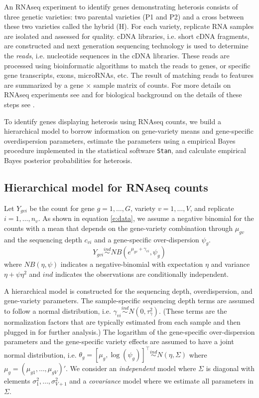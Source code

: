 \documentclass[useAMS,usenatbib,referee]{biom}
\begin{document}
An RNAseq experiment to identify genes demonstrating heterosis consists of three genetic varieties: two parental varieties (P1 and P2) and a cross between these two varieties called the hybrid (H). For each variety, replicate RNA samples are isolated and assessed for quality. cDNA libraries, i.e. short cDNA fragments, are constructed and next generation sequencing technology is used to determine the \emph{reads}, i.e. nucleotide sequences in the cDNA libraries. These reads are processed using bioinformatic algorithms to match the reads to genes, or specific gene transcripts, exons, microRNAs, etc. The result of matching reads to features are summarized by a gene $\times$ sample matrix of counts. For more details on RNAseq experiments see \cite{nettleton2014design} and for biological background on the details of these steps see \cite{paschold2012complementation}.

To identify genes displaying heterosis using RNAseq counts, we build a hierarchical model to borrow information on gene-variety means and gene-specific overdispersion parameters, estimate the parameters using a empirical Bayes procedure implemented in the statistical software {\tt Stan}, and calculate empirical Bayes posterior probabilities for heterosis. 


\subsection{Hierarchical model for RNAseq counts}
\label{s:model}

Let $Y_{gvi}$ be the count for gene $g=1,\ldots,G$, variety $v=1,\ldots,V$, and replicate $i=1,\ldots,n_v$. As shown in equation \eqref{e:data}, we assume a negative binomial for the counts with a mean that depends on the gene-variety combination through $\mu_{gv}$ and the sequencing depth $c_{vi}$ and a gene-specific over-dispersion $\psi_g$. 
\begin{equation} 
Y_{gvi} \stackrel{ind}{\sim} NB(e^{\mu_{gv}+\gamma_{vi}},\psi_g) 
\label{e:data}
\end{equation}
where $NB(\eta,\psi)$ indicates a negative-binomial with expectation $\eta$ and variance $\eta+\psi\eta^2$ and $ind$ indicates the observations are conditionally independent.

A hierarchical model is constructed for the sequencing depth, overdispersion, and gene-variety parameters. The sample-specific sequencing depth terms are assumed to follow a normal distribution, i.e. $\gamma_{vi} \stackrel{ind}{\sim} N(0,\tau_\gamma^2)$. (These terms are the normalization factors that are typically estimated from each sample and then plugged in for further analysis.) The logarithm of the gene-specific over-dispersion parameters and the gene-specific variety effects are assumed to have a joint normal distribution, i.e. 
$\theta_g = [\mu_g, \log(\psi_g)]^\top \stackrel{ind}{\sim} N\left(\eta, \Sigma\right)$
where $\mu_g = (\mu_{g1},\ldots,\mu_{gV})'$. We consider an \emph{independent} model where $\Sigma$ is diagonal with elements $\sigma_1^2,\ldots,\sigma_{V+1}^2$ and a \emph{covariance} model where we estimate all parameters in $\Sigma$. 
\end{document}
